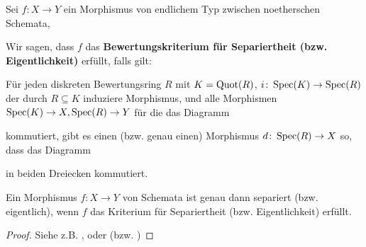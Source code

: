 \begin{bem}
  \label{bem:10.6}
  Sei $f\colon X \to Y$ ein Morphismus von endlichem Typ zwischen noetherschen Schemata,

  Wir sagen, dass $f$ das \textbf{Bewertungskriterium für Separiertheit (bzw. Eigentlichkeit)} erfüllt, falls gilt:
    
  Für jeden diskreten Bewertungsring $R$ mit $K = \operatorname{Quot}(R)$, $i \colon \operatorname{Spec}(K) \to \operatorname{Spec}(R)$ der durch $R \subseteq K$ induziere Morphismus, und alle Morphismen $\operatorname{Spec}(K) \to X, \operatorname{Spec}(R) \to Y$ für die das Diagramm
  \begin{center}
  \end{center}
  kommutiert, gibt es einen (bzw. genau einen) Morphismus $d \colon \operatorname{Spec}(R) \to X$ so, dass das Diagramm
  \begin{center}
  \end{center}
  in beiden Dreiecken kommutiert.
\end{bem}

\begin{thm}
  \label{thm:10.7}
  Ein Morphismus $f \colon X \to Y$ von Schemata ist genau dann separiert (bzw. eigentlich), wenn $f$ das Kriterium für Separiertheit (bzw. Eigentlichkeit) erfüllt.
  \begin{proof}
    Siehe z.B. \cite[7.2.3]{grothendieck1971elements}, oder \cite[Thm. 15.9]{goertz2010algebraic} (bzw. \cite[Thm 7.3.8]{grothendieck1971elements})
  \end{proof}
\end{thm}

